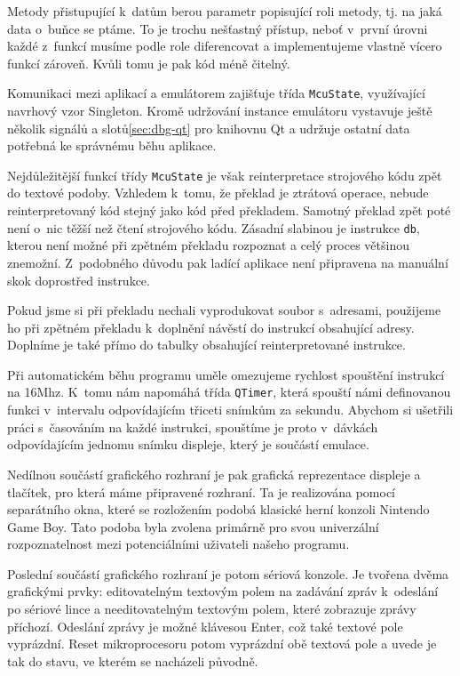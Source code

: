 Metody přistupující k~datům berou parametr popisující roli metody, tj. na jaká data o~buňce se ptáme. To je trochu nešťastný přístup, neboť v~první úrovni každé z~funkcí musíme podle role diferencovat a implementujeme vlastně vícero funkcí zároveň. Kvůli tomu je pak kód méně čitelný.


Komunikaci mezi aplikací a emulátorem zajišťuje třída \texttt{McuState}, využívající navrhový vzor Singleton\cite{gof}. Kromě udržování instance emulátoru vystavuje ještě několik signálů a slotů\ref{sec:dbg-qt} pro knihovnu Qt a udržuje ostatní data potřebná ke správnému běhu aplikace.

Nejdůležitější funkcí třídy \texttt{McuState} je však reinterpretace strojového kódu zpět do textové podoby. Vzhledem k~tomu, že překlad je ztrátová operace, nebude reinterpretovaný kód stejný jako kód před překladem. Samotný překlad zpět poté není o~nic těžší než čtení strojového kódu. Zásadní slabinou je instrukce \texttt{db}, kterou není možné při zpětném překladu rozpoznat a celý proces většinou znemožní. Z~podobného důvodu pak ladící aplikace není připravena na manuální skok doprostřed instrukce.

Pokud jsme si při překladu nechali vyprodukovat soubor s~adresami, použijeme ho při zpětném překladu k~doplnění návěstí do instrukcí obsahující adresy. Doplníme je také přímo do tabulky obsahující reinterpretované instrukce.

Při automatickém běhu programu uměle omezujeme rychlost spouštění instrukcí na 16Mhz. K~tomu nám napomáhá třída \texttt{QTimer}, která spouští námi definovanou funkci v~intervalu odpovídajícím třiceti snímkům za sekundu. Abychom si ušetřili práci s~časováním na každé instrukci, spouštíme je proto v~dávkách odpovídajícím jednomu snímku displeje, který je součástí emulace.

Nedílnou součástí grafického rozhraní je pak grafická reprezentace displeje a tlačítek, pro která máme připravené rozhraní. Ta je realizována pomocí separátního okna, které se rozložením podobá klasické herní konzoli Nintendo Game Boy. Tato podoba byla zvolena primárně pro svou univerzální rozpoznatelnost mezi potenciálními uživateli našeho programu.


Poslední součástí grafického rozhraní je potom sériová konzole. Je tvořena dvěma grafickými prvky: editovatelným textovým polem na zadávání zpráv k~odeslání po sériové lince a needitovatelným textovým polem, které zobrazuje zprávy příchozí. Odeslání zprávy je možné klávesou Enter, což také textové pole vyprázdní. Reset mikroprocesoru potom vyprázdní obě textová pole a uvede je tak do stavu, ve kterém se nacházeli původně.

